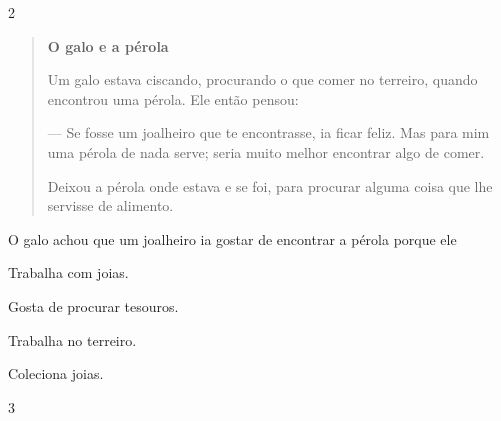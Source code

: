 \num{2}

\begin{quote}
\textbf{O galo e a pérola}

Um galo estava ciscando, procurando o que comer no terreiro,
quando encontrou uma pérola. Ele então pensou:

--- Se fosse um joalheiro que te encontrasse, ia ficar feliz.
Mas para mim uma pérola de nada serve; seria muito melhor
encontrar algo de comer.

Deixou a pérola onde estava e se foi, para procurar
alguma coisa que lhe servisse de alimento.
\end{quote}


O galo achou que um joalheiro ia gostar de encontrar a pérola porque ele

\begin{escolha}
\item Trabalha com joias.

\item Gosta de procurar tesouros.

\item Trabalha no terreiro.

\item Coleciona joias.
\end{escolha}


\num{3}

